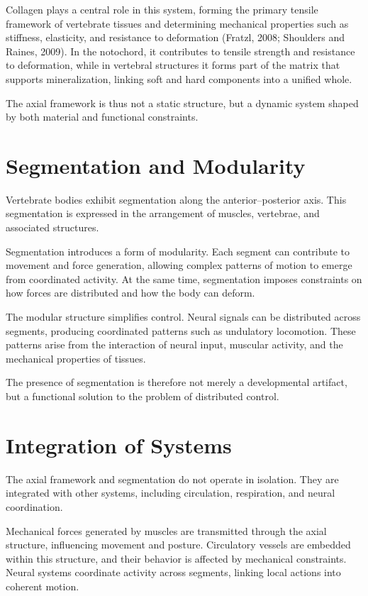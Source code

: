 \documentclass[11pt,oneside]{book}
\begin{document}
Collagen plays a central role in this system, forming the primary tensile framework of vertebrate tissues and determining mechanical properties such as stiffness, elasticity, and resistance to deformation (Fratzl, 2008; Shoulders and Raines, 2009). In the notochord, it contributes to tensile strength and resistance to deformation, while in vertebral structures it forms part of the matrix that supports mineralization, linking soft and hard components into a unified whole.

The axial framework is thus not a static structure, but a dynamic system shaped by both material and functional constraints.

\section{Segmentation and Modularity}

Vertebrate bodies exhibit segmentation along the anterior–posterior axis. This segmentation is expressed in the arrangement of muscles, vertebrae, and associated structures.

Segmentation introduces a form of modularity. Each segment can contribute to movement and force generation, allowing complex patterns of motion to emerge from coordinated activity. At the same time, segmentation imposes constraints on how forces are distributed and how the body can deform.

The modular structure simplifies control. Neural signals can be distributed across segments, producing coordinated patterns such as undulatory locomotion. These patterns arise from the interaction of neural input, muscular activity, and the mechanical properties of tissues.

The presence of segmentation is therefore not merely a developmental artifact, but a functional solution to the problem of distributed control.

\section{Integration of Systems}

The axial framework and segmentation do not operate in isolation. They are integrated with other systems, including circulation, respiration, and neural coordination.

Mechanical forces generated by muscles are transmitted through the axial structure, influencing movement and posture. Circulatory vessels are embedded within this structure, and their behavior is affected by mechanical constraints. Neural systems coordinate activity across segments, linking local actions into coherent motion.
\end{document}

